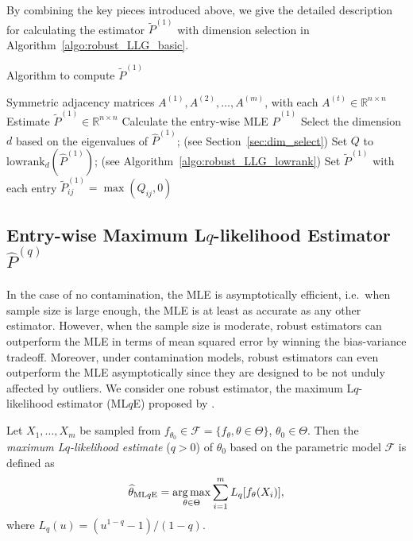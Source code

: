 By combining the key pieces introduced above, we give the detailed description for calculating the estimator $\widetilde{P}^{(1)}$ with dimension selection in Algorithm~\ref{algo:robust_LLG_basic}.

\begin{algorithm}[H]
\caption{Algorithm to compute $\widetilde{P}^{(1)}$}
\label{algo:robust_LLG_basic}
\begin{algorithmic}[1]
\REQUIRE Symmetric adjacency matrices $A^{(1)}, A^{(2)}, \dotsc, A^{(m)}$, with each $A^{(t)} \in \mathbb{R}^{n \times n}$
\ENSURE Estimate $\widetilde{P}^{(1)} \in \mathbb{R}^{n \times n}$
\STATE Calculate the entry-wise MLE $\hat{P}^{(1)}$
\STATE Select the dimension $d$ based on the eigenvalues of $\hat{P}^{(1)}$; (see Section~\ref{sec:dim_select})
\STATE Set $Q$ to $\mathrm{lowrank}_d(\hat{P}^{(1)})$; (see Algorithm~\ref{algo:robust_LLG_lowrank})
\STATE Set $\widetilde{P}^{(1)}$ with each entry $\widetilde{P}^{(1)}_{ij} = \max(Q_{ij}, 0)$
\end{algorithmic}
\end{algorithm}





\subsection{Entry-wise Maximum L$q$-likelihood Estimator $\hat{P}^{(q)}$}

In the case of no contamination, the MLE is asymptotically efficient, i.e.\ when sample size is large enough, the MLE is at least as accurate as any other estimator. However, when the sample size is moderate, robust estimators can outperform the MLE in terms of mean squared error by winning the bias-variance tradeoff. Moreover, under contamination models, robust estimators can even outperform the MLE asymptotically since they are designed to be not unduly affected by outliers. We consider one robust estimator, the maximum L$q$-likelihood estimator (ML$q$E) proposed by \citet{ferrari2010maximum}.

\begin{definition} [ML$q$E]
\label{def:MLqE}
Let $X_1, \dotsc, X_m$ be sampled from $f_{\theta_0} \in \mathcal{F} = \{ f_{\theta}, \theta \in \Theta \}$, $\theta_0 \in \Theta$. Then the {\em{maximum L$q$-likelihood estimate}} ($q > 0$) of $\theta_0$ based on the parametric model $\mathcal{F}$ is defined as
\[
	\widehat{\theta}_{\mathrm{ML}q\mathrm{E}} = \operatorname*{arg\,max}_{\theta \in \Theta} \sum_{i=1}^m L_q[f_{\theta}(X_i)],
\]
where $L_q(u) = (u^{1-q} - 1)/(1- q)$.
\end{definition}

